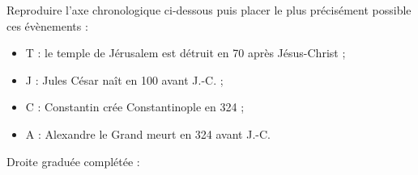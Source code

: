 \begin{exercice*}
    Reproduire l'axe chronologique ci-dessous puis placer le plus précisément possible ces évènements : \\ [2mm]
    \begin{itemize}
       \item T : le temple de Jérusalem est détruit en 70 après Jésus-Christ ;
       \item J : Jules César naît en 100 avant J.-C. ;
       \item C : Constantin crée Constantinople en 324 ;
       \item A : Alexandre le Grand meurt en 324 avant J.-C.
    \end{itemize}
 \end{exercice*}
 
 \begin{corrige}
    Droite graduée complétée : \\ [2mm]
    \hspace*{-10mm} 
 \end{corrige}